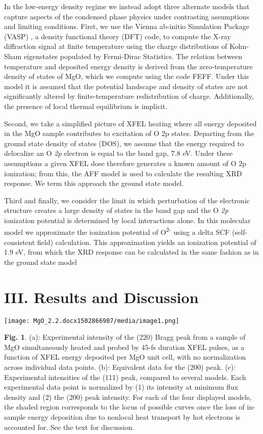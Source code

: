 In the low-energy density regime we instead adopt three alternate models
that capture aspects of the condensed phase physics under contrasting
assumptions and limiting conditions. First, we use the Vienna ab-initio
Simulation Package (VASP) \cite{HAFNER2008AB}, a density functional theory (DFT)
code, to compute the X-ray diffraction signal at finite temperature
using the charge distributions of Kohn-Sham eigenstates populated by
Fermi-Dirac Statistics. The relation between temperature and deposited
energy density is derived from the zero-temperature density of states of
MgO, which we compute using the code FEFF. \cite{ANKUDINOV1998REAL} Under this model it
is assumed that the potential landscape and density of states are not
significantly altered by finite-temperature redistribution of charge.
Additionally, the presence of local thermal equilibrium is implicit.

Second, we take a simplified picture of XFEL heating where all energy
deposited in the MgO sample contributes to excitation of O 2p states.
Departing from the ground state density of states (DOS), we assume that
the energy required to delocalize an O \emph{2p} electron is equal to
the band gap, 7.8 eV. Under these assumptions a given XFEL dose
therefore generates a known amount of O 2p ionization; from this, the
AFF model is used to calculate the resulting XRD response. We term this
approach the ground state model.

Third and finally, we consider the limit in which perturbation of the
electronic structure creates a large density of states in the band gap
and the O \emph{2p} ionization potential is determined by local
interactions alone. In this molecular model we approximate the
ionization potential of O\textsuperscript{2-} using a delta SCF
(self-consistent field) calculation. \cite{NEESE2006CRITICAL} This approximation yields
an ionization potential of 1.9 eV, from which the XRD response can be
calculated in the same fashion as in the ground state model

\section{III. Results and Discussion}

\begin{center}
\texttt{[image: MgO\_2.2.docx1502866987/media/image1.png]}
\end{center}
\textbf{Fig. 1}. (a): Experimental intensity of the (220) Bragg peak
from a sample of MgO simultaneously heated and probed by 45-fs duration
XFEL pulses, as a function of XFEL energy deposited per MgO unit cell,
with no normalization across individual data points. (b): Equivalent
data for the (200) peak. (c): Experimental intensities of the (111)
peak, compared to several models. Each experimental data point is
normalized by (1) its intensity at minimum flux density and (2) the
(200) peak intensity. For each of the four displayed models, the shaded
region corresponds to the locus of possible curves once the loss of
in-sample energy deposition due to nonlocal heat transport by hot
electrons is accounted for. See the text for discussion.
\bigbreak

